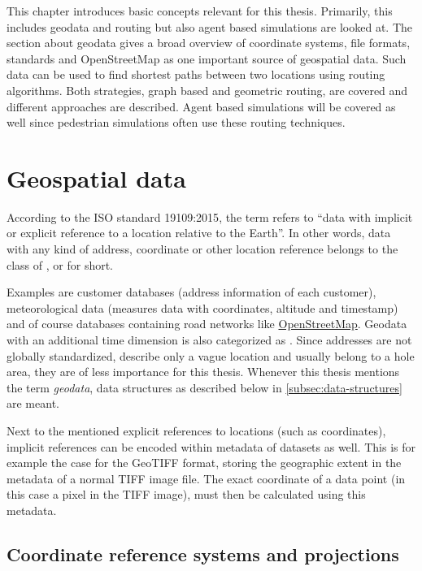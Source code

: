 
This chapter introduces basic concepts relevant for this thesis.
Primarily, this includes geodata and routing but also agent based simulations are looked at.
The section about geodata gives a broad overview of coordinate systems, file formats, standards and OpenStreetMap as one important source of geospatial data.
Such data can be used to find shortest paths between two locations using routing algorithms.
Both strategies, graph based and geometric routing, are covered and different approaches are described.
Agent based simulations will be covered as well since pedestrian simulations often use these routing techniques.

\section{Geospatial data}

	According to the ISO standard 19109:2015\cite{geolexica-202}, the term  refers to \enquote{data with implicit or explicit reference to a location relative to the Earth}.
	In other words, data with any kind of address, coordinate or other location reference belongs to the class of , or  for short.
	
	Examples are customer databases (address information of each customer), meteorological data (measures data with coordinates, altitude and timestamp) and of course databases containing road networks like \hyperref[subsec:osm]{OpenStreetMap}.
	Geodata with an additional time dimension is also categorized as .
	Since addresses are not globally standardized, describe only a vague location and usually belong to a hole area, they are of less importance for this thesis.
	Whenever this thesis mentions the term \emph{geodata}, data structures as described below in \cref{subsec:data-structures} are meant.
	
	Next to the mentioned explicit references to locations (such as coordinates), implicit references can be encoded within metadata of datasets as well.
	This is for example the case for the GeoTIFF format, storing the geographic extent in the metadata of a normal TIFF image file\cite{ogc-geotiff}.
	The exact coordinate of a data point (in this case a pixel in the TIFF image), must then be calculated using this metadata.

	\subsection{Coordinate reference systems and projections}
	
